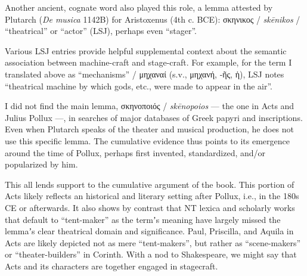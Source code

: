 \noindent{}Another ancient, cognate word also played this role, %
a lemma attested by Plutarch (\textit{De musica} 1142B) for Aristoxenus %
(4th c. BCE): %
σκηνικος / \textit{skēnikos} / “theatrical” or “actor” (LSJ), perhaps even “stager”.

Various LSJ entries provide helpful supplemental context about the semantic association %
between machine-craft and stage-craft. %
For example, for the term I translated above as “mechanisms” / μηχαναί (s.v., μηχανή, ‑ῆς, ἡ), %
LSJ notes “theatrical machine by which gods, etc., were made to appear in the air”. %

I did not find the main lemma, σκηνοποιός / \textit{skēnopoios} --- the one in Acts and Julius Pollux ---, %
in searches of major databases of Greek papyri and inscriptions. %
Even when Plutarch speaks of the theater and musical production, %
he does not use this specific lemma. %
The cumulative evidence thus points to its emergence around the time of Pollux, %
perhaps first invented, standardized, and/or popularized by him. %

This all lends support to the cumulative argument of the book. %
This portion of Acts likely reflects an historical and literary setting after Pollux, %
i.e., in the 180s CE or afterwards. %
It also shows by contrast that NT lexica and scholarly works that default to “tent-maker” %
as the termʼs meaning have largely missed the lemmaʼs clear theatrical domain and significance. %
Paul, Priscilla, and Aquila in Acts are likely depicted not as mere “tent-makers”, %
but rather as “scene-makers” or “theater-builders” in Corinth. %
With a nod to Shakespeare, we might say that Acts and its characters are together engaged in stagecraft. %